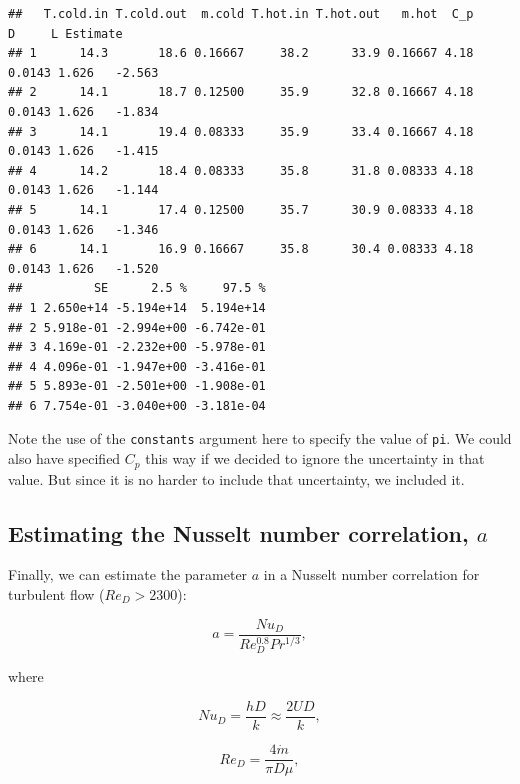 \documentclass[twoside]{book}\usepackage[]{graphicx}\usepackage[]{xcolor}
\makeatletter
\newenvironment{kframe}{%
 \def\at@end@of@kframe{}%
 \ifinner\ifhmode%
  \def\at@end@of@kframe{\end{minipage}}%
  \begin{minipage}{\columnwidth}%
 \fi\fi%
 \def\FrameCommand##1{\hskip\@totalleftmargin \hskip-\fboxsep
 \colorbox{shadecolor}{##1}\hskip-\fboxsep
     \hskip-\linewidth \hskip-\@totalleftmargin \hskip\columnwidth}%
 \MakeFramed {\advance\hsize-\width
   \@totalleftmargin\z@ \linewidth\hsize
   \@setminipage}}%
 {\par\unskip\endMakeFramed%
 \at@end@of@kframe}
\newenvironment{knitrout}{}{} %
\newcommand{\variable}[1]{{\color{green!50!black}\texttt{#1}}}
\newcommand{\option}[1]{{\color{brown!80!black}\texttt{#1}}}
\makeatother
\begin{document}
\begin{knitrout}
\begin{kframe}
{\ttfamily\noindent\itshape\color{messagecolor}{\#\# Converting uncertainties to a covariance matrix assuming independence ...}}\begin{verbatim}
##   T.cold.in T.cold.out  m.cold T.hot.in T.hot.out   m.hot  C_p      D     L Estimate
## 1      14.3       18.6 0.16667     38.2      33.9 0.16667 4.18 0.0143 1.626   -2.563
## 2      14.1       18.7 0.12500     35.9      32.8 0.16667 4.18 0.0143 1.626   -1.834
## 3      14.1       19.4 0.08333     35.9      33.4 0.16667 4.18 0.0143 1.626   -1.415
## 4      14.2       18.4 0.08333     35.8      31.8 0.08333 4.18 0.0143 1.626   -1.144
## 5      14.1       17.4 0.12500     35.7      30.9 0.08333 4.18 0.0143 1.626   -1.346
## 6      14.1       16.9 0.16667     35.8      30.4 0.08333 4.18 0.0143 1.626   -1.520
##          SE      2.5 %     97.5 %
## 1 2.650e+14 -5.194e+14  5.194e+14
## 2 5.918e-01 -2.994e+00 -6.742e-01
## 3 4.169e-01 -2.232e+00 -5.978e-01
## 4 4.096e-01 -1.947e+00 -3.416e-01
## 5 5.893e-01 -2.501e+00 -1.908e-01
## 6 7.754e-01 -3.040e+00 -3.181e-04
\end{verbatim}
\end{kframe}
\end{knitrout}

Note the use of the \option{constants} argument here to specify the value of \variable{pi}.  
We could also have specified $C_p$ this way if we decided to ignore the uncertainty
in that value.  But since it is no harder to include that uncertainty, we included it.


\subsection{Estimating the Nusselt number correlation,  $a$}

Finally, we can estimate
the parameter $a$ in a Nusselt number correlation
for turbulent flow ($Re_{D} > 2300$):

\begin{equation}
    a = \frac{Nu_D}{Re_{D}^{0.8} Pr^{1/3}},
\end{equation}

\noindent{}where

\begin{equation}
	Nu_{D} = \frac{h D}{k} \approx \frac{ 2 U D}{k}, 
\end{equation}

\begin{equation}
    Re_{D} = \frac{4 \dot{m}}{\pi D \mu},
\end{equation}
\end{document}
